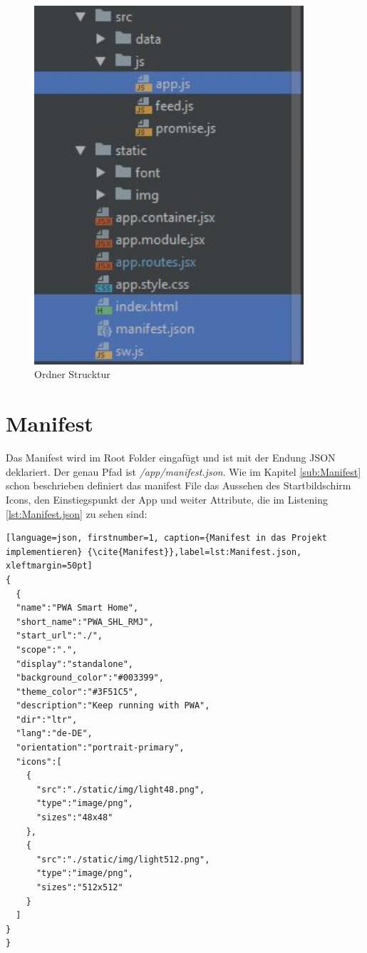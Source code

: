 \begin{figure}[h]
	\centering
	\includegraphics[width=10cm]{BilderAllgemein/Implementierung/OrdnerStrucktur.jpg}\medskip
	\caption{Ordner Strucktur}
	\label{fig:OrdnerStrucktur}
\end{figure} 


\section{Manifest}
Das Manifest wird im Root Folder eingafügt und ist mit der Endung JSON deklariert. Der genau Pfad ist \textit{/app/manifest.json}. Wie im Kapitel \ref{sub:Manifest} schon beschrieben definiert das manifest File das Aussehen des Startbildschirm Icons, den Einstiegspunkt der App und weiter Attribute, die im Listening \ref{lst:Manifest.json} zu sehen sind:
\newpage
\begin{lstlisting}[language=json, firstnumber=1, caption={Manifest in das Projekt implementieren} {\cite{Manifest}},label=lst:Manifest.json, xleftmargin=50pt]
{
  {
  "name":"PWA Smart Home",
  "short_name":"PWA_SHL_RMJ",
  "start_url":"./",
  "scope":".",
  "display":"standalone",
  "background_color":"#003399",
  "theme_color":"#3F51C5",
  "description":"Keep running with PWA",
  "dir":"ltr",
  "lang":"de-DE",
  "orientation":"portrait-primary",
  "icons":[
    {
      "src":"./static/img/light48.png",
      "type":"image/png",
      "sizes":"48x48"
    },
    {
      "src":"./static/img/light512.png",
      "type":"image/png",
      "sizes":"512x512"
    }
  ]
}
}
\end{lstlisting}

